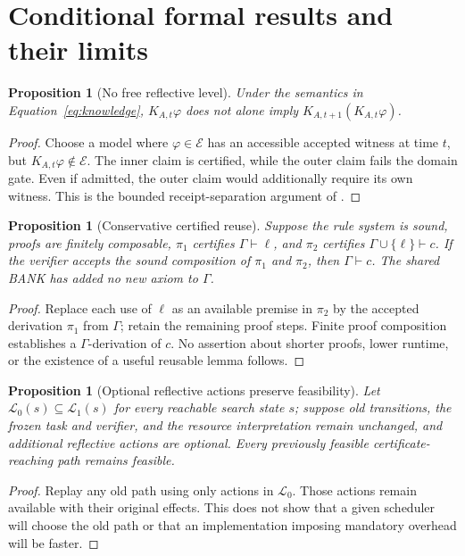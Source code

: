 \documentclass[11pt,letterpaper]{article}
\newtheorem{proposition}[definition]{Proposition}
\begin{document}
\section{Conditional formal results and their limits}
\begin{proposition}[No free reflective level]\label{prop:nofree}
Under the semantics in Equation~\eqref{eq:knowledge}, $K_{A,t}\varphi$ does not alone imply $K_{A,t+1}(K_{A,t}\varphi)$.
\end{proposition}
\begin{proof}
Choose a model where $\varphi\in\mathcal E$ has an accessible accepted witness at time $t$, but $K_{A,t}\varphi\notin\mathcal E$. The inner claim is certified, while the outer claim fails the domain gate. Even if admitted, the outer claim would additionally require its own witness. This is the bounded receipt-separation argument of \cite{reflective}.
\end{proof}

\begin{proposition}[Conservative certified reuse]\label{prop:reuse}
Suppose the rule system is sound, proofs are finitely composable, $\pi_1$ certifies $\Gamma\vdash\ell$, and $\pi_2$ certifies $\Gamma\cup\{\ell\}\vdash c$. If the verifier accepts the sound composition of $\pi_1$ and $\pi_2$, then $\Gamma\vdash c$. The shared BANK has added no new axiom to $\Gamma$.
\end{proposition}
\begin{proof}
Replace each use of $\ell$ as an available premise in $\pi_2$ by the accepted derivation $\pi_1$ from $\Gamma$; retain the remaining proof steps. Finite proof composition establishes a $\Gamma$-derivation of $c$. No assertion about shorter proofs, lower runtime, or the existence of a useful reusable lemma follows.
\end{proof}

\begin{proposition}[Optional reflective actions preserve feasibility]\label{prop:optional}
Let $\mathcal L_0(s)\subseteq\mathcal L_1(s)$ for every reachable search state $s$; suppose old transitions, the frozen task and verifier, and the resource interpretation remain unchanged, and additional reflective actions are \emph{optional}. Every previously feasible certificate-reaching path remains feasible.
\end{proposition}
\begin{proof}
Replay any old path using only actions in $\mathcal L_0$. Those actions remain available with their original effects. This does not show that a given scheduler will choose the old path or that an implementation imposing mandatory overhead will be faster.
\end{proof}
\end{document}
